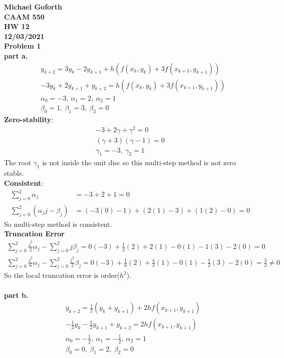 \documentclass{article} %
\begin{document}
\textbf{Michael Goforth} \\
\textbf{CAAM 550} \\
\textbf{HW 12} \\
\textbf{12/03/2021} \\ 

\textbf{Problem 1} \\
\textbf{part a.}
\begin{align*}
&y_{k+2} = 3y_k - 2y_{k+1} +h(f(x_k, y_k) + 3f(x_{k+1}, y_{k+1})) \\
&-3y_k + 2y_{k+1} + y_{k+2} = h(f(x_k, y_k) + 3f(x_{k+1}, y_{k+1})) \\
&\alpha_0 = -3, \: \alpha_1 = 2, \: \alpha_2 = 1 \\
&\beta_0 = 1, \: \beta_1 = 3, \: \beta_2 = 0
\end{align*}
\textbf{Zero-stability}:
\begin{align*}
-3 + 2\gamma + \gamma^2 = 0 \\
(\gamma + 3)(\gamma - 1) = 0 \\
\gamma_1 = -3, \: \gamma_2 = 1
\end{align*}
The root $\gamma_1$ is not inside the unit disc so this multi-step method is not zero stable.\\
\textbf{Consistent}:
\begin{align*}
\sum_{j=0}^{2}\alpha_j &= -3 + 2 + 1 = 0 \\
\sum_{j=0}^{2}(\alpha_j  j - \beta_j) &= (-3(0)-1) + (2(1)-3)+(1(2)-0)=0
\end{align*}
So multi-step method is consistent. \\
\textbf{Truncation Error}
\begin{align*}
\sum_{j=0}^{2} \frac{j^2}{2}\alpha_j - \sum_{j=0}^{2}j \beta_j = 0(-3) + \frac{1}{2}(2) + 2(1) - 0(1) - 1(3) - 2(0) = 0 \\
\sum_{j=0}^{2} \frac{j^3}{6}\alpha_j - \sum_{j=0}^{2}\frac{j^2}{2} \beta_j = 0(-3) + \frac{1}{6}(2) + \frac{4}{3}(1) - 0(1) - \frac{1}{2}(3) - 2(0) = \frac{3}{2} \neq 0
\end{align*}
So the local truncation error is order($h^2$). \\
\\
\textbf{part b.} 
\begin{align*}
&y_{k+2} = \frac{1}{2}(y_k + y_{k+1}) + 2hf(x_{k+1}, y_{k+1}) \\
&-\frac{1}{2} y_k -\frac{1}{2} y_{k+1} + y_{k+2} = 2hf(x_{k+1}, y_{k+1}) \\
&\alpha_0 = -\frac{1}{2}, \: \alpha_1 = -\frac{1}{2}, \: \alpha_2 = 1 \\
&\beta_0 = 0, \: \beta_1 = 2, \: \beta_2 = 0
\end{align*}
\end{document}
